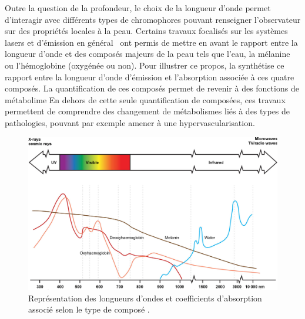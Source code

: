Outre la question de la profondeur, le choix de la longueur d'onde permet d'interagir avec différents types de chromophores pouvant renseigner l'observateur sur des propriétés locales à la peau. Certains travaux focalisés sur les systèmes lasers et  d'émission en général~\cite{Stewart2013} ont permis de mettre en avant le rapport entre la longueur d'onde et des composés majeurs de la peau tels que l'eau, la mélanine ou l'hémoglobine (oxygénée ou non). Pour illustrer ce propos, la  synthétise ce rapport entre la longueur d'onde d'émission et l'absorption associée à ces quatre composés. La quantification de ces composés permet de revenir à des fonctions de métabolime\cite{Im2016}
En dehors de cette seule quantification de composées, ces travaux permettent de comprendre des changement de métabolismes liés à des types de pathologies, pouvant par exemple amener à une hypervascularisation.\par
\begin{figure}[H]
    \centering
    \includegraphics[width=\linewidth]{contents/chapter_2/resources/light_absorption.png}
    \caption{Représentation des longueurs d'ondes et coefficients d'absorption associé selon le type de composé \cite{Stewart2013}.}
    \label{fig:light_absorption}
\end{figure}
 
\clearpage
